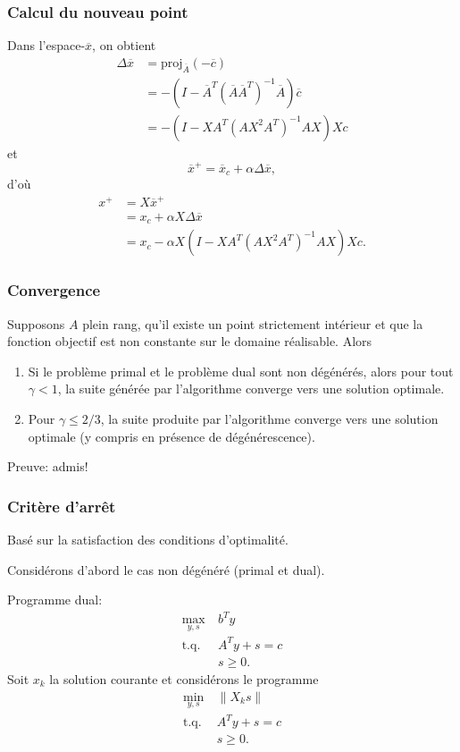 \documentclass[t,usepdftitle=false]{beamer}
\begin{document}
\begin{frame}
	\frametitle{Calcul du nouveau point}
	
	Dans l'espace-$\overline{x}$, on obtient %
	\begin{align*}
		\Delta\overline{x} &= \text{proj}_{\overline{A}}(-\overline{c}) \\
		& = -(I - \overline{A}^T(\overline{A}\overline{A}^T)^{-1}\overline{A})\overline{c} \\
		& = -(I - XA^T(AX^2A^T)^{-1}AX)Xc
	\end{align*}
	et
	$$
	\overline{x}^+ = \overline{x}_c + \alpha \Delta \overline{x},
	$$
	d'où
	\begin{align*}
		x^+ &= X\overline{x}^+ \\
		&= x_c + \alpha X \Delta \overline{x} \\
		&= x_c - \alpha X(I - XA^T(AX^2A^T)^{-1}AX)Xc.
	\end{align*}
	
\end{frame}

\begin{frame}
	\frametitle{Convergence}
	
	Supposons $A$ plein rang, qu'il existe un point strictement intérieur et que la fonction objectif est non constante sur le domaine réalisable.
	Alors
	\begin{enumerate}
		\item
		Si le problème primal et le problème dual sont non dégénérés, alors pour tout $\gamma < 1$, la suite générée par l'algorithme converge vers une solution optimale.
		\item
		Pour $\gamma \leq 2/3$, la suite produite par l’algorithme converge
		vers une solution optimale (y compris en présence de dégénérescence).
	\end{enumerate}
	
	Preuve: admis!
	
\end{frame}

\begin{frame}
	\frametitle{Critère d’arrêt}
	
	Basé sur la satisfaction des conditions d'optimalité.
	
	\mbox{}
	
	Considérons d’abord le cas non dégénéré (primal et dual).
	
	\mbox{}
	
	Programme dual:
	\begin{align*}
		\max_{y,s} \ & b^Ty \\
		\mbox{t.q. } & A^Ty + s = c \\
		& s \geq 0.
	\end{align*}
	Soit $x_k$ la solution courante et considérons le programme
	\begin{align*}
		\min_{y,s} \ & \| X_ks \| \\
		\mbox{t.q. } & A^Ty + s = c \\
		& s \geq 0.
	\end{align*}
	
\end{frame}
\end{document}
